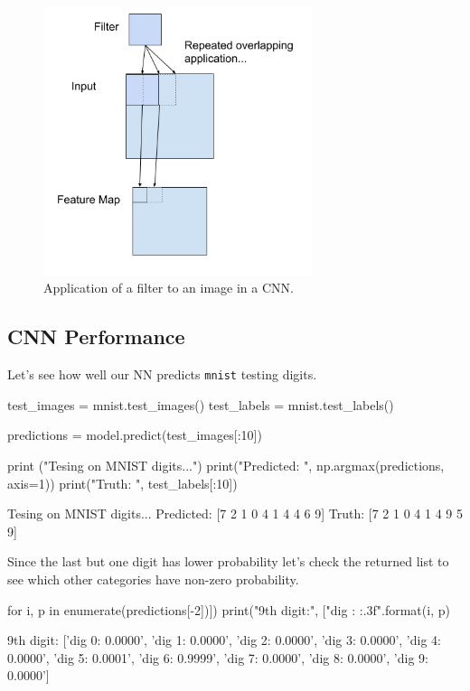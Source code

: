 \begin{figure}[htb]
\centering
\includegraphics[width=0.7\textwidth]{figures/conv2d}
\caption{Application of a filter to an image in a CNN.}
\label{fig:kernel}
\end{figure}

\subsection{CNN Performance}
Let's see how well our NN predicts \texttt{mnist} testing digits.

\begin{ipython}
test_images = mnist.test_images()
test_labels = mnist.test_labels()

predictions = model.predict(test_images[:10])

print ("Tesing on MNIST digits...")
print("Predicted: ", np.argmax(predictions, axis=1)) 
print("Truth:     ", test_labels[:10])
\end{ipython}
\begin{ioutput}
Tesing on MNIST digits...
Predicted:  [7 2 1 0 4 1 4 4 6 9]
Truth: [7 2 1 0 4 1 4 9 5 9]
\end{ioutput}

Since the last but one digit has lower probability let's check the returned list to see which other categories have non-zero probability.

\begin{ipython}
for i, p in enumerate(predictions[-2])])
    print("9th digit:", ["dig {}: {:.3f}".format(i, p)
\end{ipython}
\begin{ioutput}
9th digit: ['dig 0: 0.0000', 'dig 1: 0.0000', 'dig 2: 0.0000', 'dig 3: 0.0000', 
            'dig 4: 0.0000', 'dig 5: 0.0001', 'dig 6: 0.9999', 'dig 7: 0.0000', 
            'dig 8: 0.0000', 'dig 9: 0.0000']
\end{ioutput}

